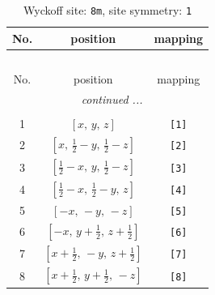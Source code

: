 \documentclass[fleqn,8pt]{jsarticle}
\begin{document}
\renewcommand{\arraystretch}{1.2}
\begin{longtable}{ccc}
\caption{Wyckoff site: {\tt 8m}, site symmetry: {\tt 1}}
 \\
 \hline \hline
No. & position & mapping \\ \hline \endfirsthead

\multicolumn{2}{l}{\tablename\ \thetable{}} \\
 \hline \hline
No. & position & mapping \\ \hline \endhead

 \hline \hline
\multicolumn{2}{r}{\footnotesize\it continued ...} \\ \endfoot

 \hline \hline
\multicolumn{2}{r}{} \\ \endlastfoot

1 & $\left[ x,\, y,\, z \right]$ & {\tt [1]} \\ \hline
2 & $\left[ x,\, \frac{1}{2} - y,\, \frac{1}{2} - z \right]$ & {\tt [2]} \\ \hline
3 & $\left[ \frac{1}{2} - x,\, y,\, \frac{1}{2} - z \right]$ & {\tt [3]} \\ \hline
4 & $\left[ \frac{1}{2} - x,\, \frac{1}{2} - y,\, z \right]$ & {\tt [4]} \\ \hline
5 & $\left[ - x,\, - y,\, - z \right]$ & {\tt [5]} \\ \hline
6 & $\left[ - x,\, y + \frac{1}{2},\, z + \frac{1}{2} \right]$ & {\tt [6]} \\ \hline
7 & $\left[ x + \frac{1}{2},\, - y,\, z + \frac{1}{2} \right]$ & {\tt [7]} \\ \hline
8 & $\left[ x + \frac{1}{2},\, y + \frac{1}{2},\, - z \right]$ & {\tt [8]} \\
\end{longtable}
\end{document}
